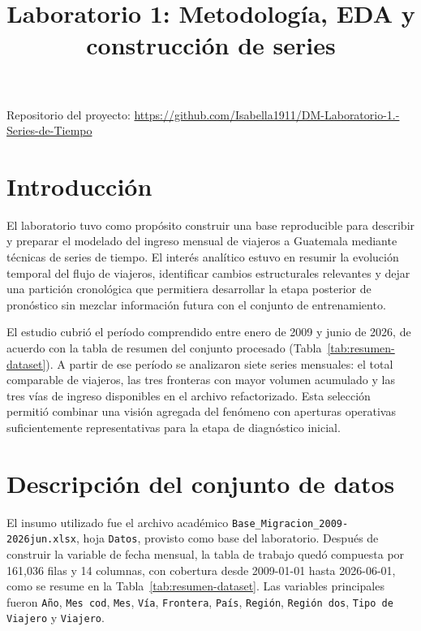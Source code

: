 \documentclass[12pt]{article}
\title{Laboratorio 1: Metodolog\'ia, EDA y construcci\'on de series}
\author{}
\date{}
\begin{document}
\maketitle

\begin{center}
Repositorio del proyecto: \url{https://github.com/Isabella1911/DM-Laboratorio-1.-Series-de-Tiempo}
\end{center}



\section{Introducción}

El laboratorio tuvo como propósito construir una base reproducible para describir y preparar el modelado del ingreso mensual de viajeros a Guatemala mediante técnicas de series de tiempo. El interés analítico estuvo en resumir la evolución temporal del flujo de viajeros, identificar cambios estructurales relevantes y dejar una partición cronológica que permitiera desarrollar la etapa posterior de pronóstico sin mezclar información futura con el conjunto de entrenamiento.

El estudio cubrió el período comprendido entre enero de 2009 y junio de 2026, de acuerdo con la tabla de resumen del conjunto procesado (Tabla~\ref{tab:resumen-dataset}). A partir de ese período se analizaron siete series mensuales: el total comparable de viajeros, las tres fronteras con mayor volumen acumulado y las tres vías de ingreso disponibles en el archivo refactorizado. Esta selección permitió combinar una visión agregada del fenómeno con aperturas operativas suficientemente representativas para la etapa de diagnóstico inicial.

\section{Descripción del conjunto de datos}

El insumo utilizado fue el archivo académico \texttt{Base\_Migracion\_2009-2026jun.xlsx}, hoja \texttt{Datos}, provisto como base del laboratorio. Después de construir la variable de fecha mensual, la tabla de trabajo quedó compuesta por 161{,}036 filas y 14 columnas, con cobertura desde 2009-01-01 hasta 2026-06-01, como se resume en la Tabla~\ref{tab:resumen-dataset}. Las variables principales fueron \texttt{Año}, \texttt{Mes cod}, \texttt{Mes}, \texttt{Vía}, \texttt{Frontera}, \texttt{País}, \texttt{Región}, \texttt{Región dos}, \texttt{Tipo de Viajero} y \texttt{Viajero}.
\end{document}
